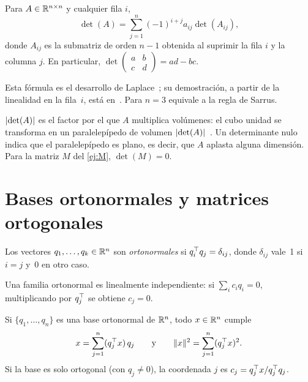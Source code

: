 \begin{proposicion}\label{prop:laplace}
Para $A\in\mathbb{R}^{n\times n}$ y cualquier fila $i$,
\[
\det(A)=\sum_{j=1}^{n}(-1)^{i+j}a_{ij}\det(A_{ij}),
\]
donde $A_{ij}$ es la submatriz de orden $n-1$ obtenida al suprimir la fila $i$ y la columna $j$. En particular, $\det\begin{pmatrix}a&b\\c&d\end{pmatrix}=ad-bc$.
\end{proposicion}

Esta fórmula es el desarrollo de Laplace~\cite[teorema~4.2]{mml}; su demostración, a partir de la linealidad en la fila~$i$, está en~\cite[§5.2]{strang-ila}. Para $n=3$ equivale a la regla de Sarrus.

\begin{observacion}
$\lvert\det(A)\rvert$ es el factor por el que $A$ multiplica volúmenes: el cubo unidad se transforma en un paralelepípedo de volumen $\lvert\det(A)\rvert$~\cite[§5.3]{strang-ila}. Un determinante nulo indica que el paralelepípedo es plano, es decir, que $A$ aplasta alguna dimensión. Para la matriz $M$ del \cref{ej:M}, $\det(M)=0$.
\end{observacion}

\section{Bases ortonormales y matrices ortogonales}\label{sec:ortogonales}

\begin{definicion}
Los vectores $q_1,\dots,q_k\in\mathbb{R}^{n}$ son \emph{ortonormales} si $q_i^{\top} q_j=\delta_{ij}$, donde $\delta_{ij}$ vale~1 si $i=j$ y~0 en otro caso.
\end{definicion}

Una familia ortonormal es linealmente independiente: si $\sum_i c_iq_i=0$, multiplicando por $q_j^{\top}$ se obtiene $c_j=0$.

\begin{proposicion}\label{prop:coord-ortonormal}
Si $\{q_1,\dots,q_n\}$ es una base ortonormal de $\mathbb{R}^{n}$, todo $x\in\mathbb{R}^{n}$ cumple
\[
x=\sum_{j=1}^{n}(q_j^{\top} x)\,q_j\qquad\text{y}\qquad \lVert x\rVert^{2}=\sum_{j=1}^{n}(q_j^{\top} x)^{2}.
\]
Si la base es solo ortogonal (con $q_j\ne 0$), la coordenada $j$ es $c_j=q_j^{\top} x/q_j^{\top} q_j$.
\end{proposicion}

